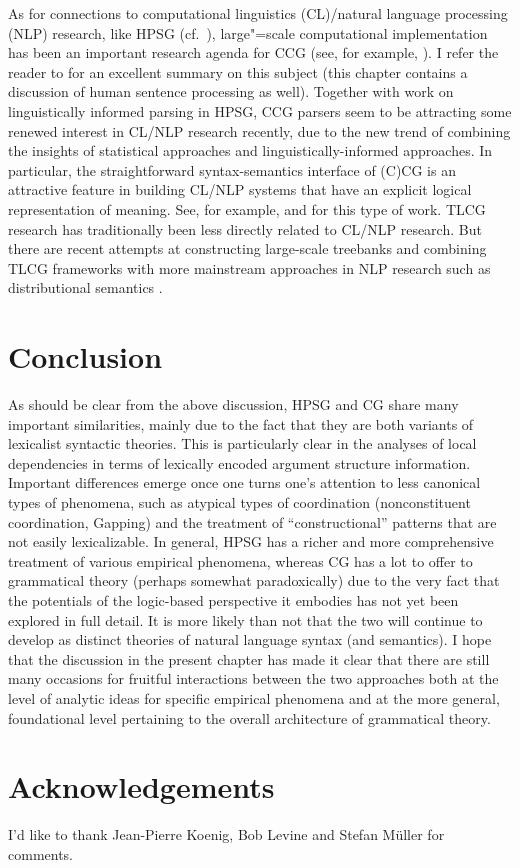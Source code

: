 \documentclass[output=paper
                ,modfonts
                ,nonflat
	        ,collection
	        ,collectionchapter
	        ,collectiontoclongg
 	        ,biblatex
                ,babelshorthands
                ,newtxmath
                ,draftmode
                ,colorlinks, citecolor=brown
]{./langsci/langscibook}
\begin{document}
As for connections to computational linguistics (CL)/natural language
processing (NLP) research, like
HPSG (cf.\ ), large"=scale computational
implementation has been an important 
research agenda for CCG (see, for example, \citealt{WhiteBaldridge2003,CC2007a-u}). I refer
the reader to \cite[Chapter 13]{steedman2012} for an excellent
summary on this subject (this chapter contains a discussion of human
sentence processing as well). Together with work on linguistically
informed parsing in HPSG, CCG parsers seem to be attracting
some renewed interest in CL/NLP research recently, due to the new trend of
combining the insights of statistical approaches and
linguistically-informed approaches. In particular, the straightforward
syntax-semantics interface of (C)CG is an attractive feature
in building CL/NLP systems that have an explicit logical
representation of meaning. See, for example, \citet{steedmanlewis13}
and \citet{mineshima-etal:2016:emnlp} 
for this type of work. TLCG research has traditionally been less
directly related to CL/NLP research. But there are recent attempts at
constructing large-scale treebanks \citep{moot2015} and combining TLCG
frameworks with more mainstream approaches in NLP research such as
distributional semantics \citep{moot2018}.


\section{Conclusion}

As should be clear from the above discussion, HPSG and CG share many
important similarities, mainly due to the fact that they are both
variants of lexicalist syntactic theories. This is particularly clear
in the analyses of local dependencies in terms of lexically encoded
argument structure information. Important differences emerge once one
turns one's attention to less canonical types of phenomena, such as
atypical types of coordination (nonconstituent coordination,
Gapping) and the treatment of ``constructional'' patterns that are not
easily lexicalizable. In general, HPSG has a richer and more
comprehensive treatment of various empirical phenomena, whereas CG has
a lot to offer to grammatical theory (perhaps somewhat paradoxically)
due to the very fact that the potentials of the logic-based
perspective it embodies has not yet been explored in full detail. It
is more likely than not that the two will continue to develop as
distinct theories of natural language syntax (and semantics). I hope
that the discussion in the present chapter has made it clear that
there are still many occasions for fruitful interactions between the
two approaches both at the level of analytic ideas for specific
empirical phenomena and at the more general, foundational level
pertaining to the overall architecture of grammatical theory.

\section*{Acknowledgements}

I'd like to thank Jean-Pierre Koenig, Bob Levine and Stefan M\"uller
for comments.

{\sloppy
\printbibliography[heading=subbibliography,notkeyword=this] 
}
\end{document}
